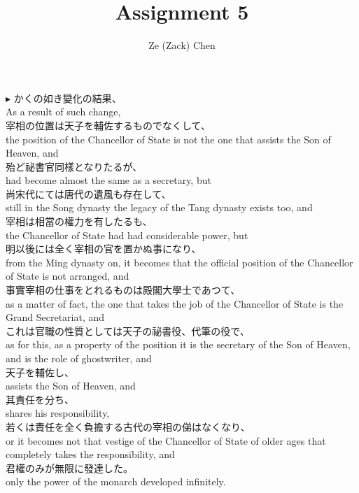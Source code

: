\documentclass{ctexart}
\title{Assignment 5}
\author{Ze (Zack) Chen}
\makeatletter
\newcommand*{\shifttext}[1]{%
  \settowidth{\@tempdima}{#1}%
  \hspace{-\@tempdima}#1%
}
\newcommand{\plabel}[1]{%
\shifttext{\textbf{#1}\quad}%
}
\makeatother
\begin{document}
\maketitle

\plabel{$\blacktriangleright$}%
かくの如き變化の結果、\\
As a result of such change,\\
宰相の位置は天子を輔佐するものでなくして、\\
the position of the Chancellor of State is not the one that assists the Son of Heaven, and\\
殆ど祕書官同樣となりたるが、\\
had become almost the same as a secretary, but\\
尚宋代にては唐代の遺風も存在して、\\
still in the Song dynasty the legacy of the Tang dynasty exists too, and\\
宰相は相當の權力を有したるも、\\
the Chancellor of State had had considerable power, but\\
明以後には全く宰相の官を置かぬ事になり、\\
from the Ming dynasty on, it becomes that the official position of the Chancellor of State is not arranged, and\\
事實宰相の仕事をとれるものは殿閣大學士であつて、\\
as a matter of fact, the one that takes the job of the Chancellor of State is the Grand Secretariat, and\\
これは官職の性質としては天子の祕書役、代筆の役で、\\
as for this, as a property of the position it is the secretary of the Son of Heaven, and is the role of ghostwriter, and\\
天子を輔佐し、\\
assists the Son of Heaven, and\\
其責任を分ち、\\
shares his responsibility,\\
若くは責任を全く負擔する古代の宰相の俤はなくなり、\\
or it becomes not that vestige of the Chancellor of State of older ages that completely takes the responsibility, and\\
君權のみが無限に發達した。\\
only the power of the monarch developed infinitely.
\end{document}
